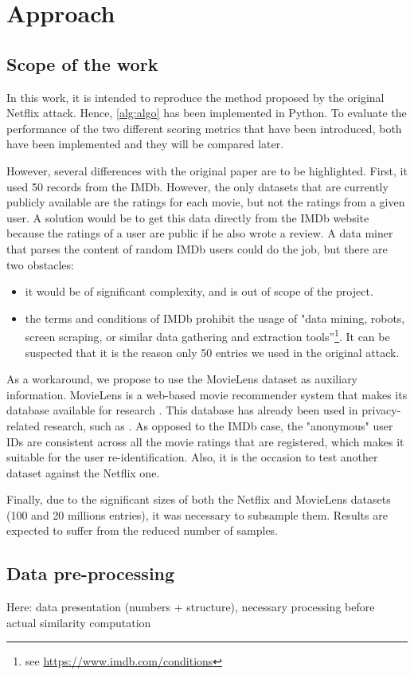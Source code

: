 \section{Approach}\label{sec:approach}

\subsection{Scope of the work}

In this work, it is intended to reproduce the method proposed by the original Netflix attack. Hence, \autoref{alg:algo} has been implemented in Python. To evaluate the performance of the two different scoring metrics that have been introduced, both have been implemented and they will be compared later.

However, several differences with the original paper are to be highlighted. First, it used 50 records from the IMDb. However, the only datasets that are currently publicly available are the ratings for each movie, but not the ratings from a given user. A solution would be to get this data directly from the IMDb website because the ratings of a user are public if he also wrote a review. A data miner that parses the content of random IMDb users could do the job, but there are two obstacles:

\begin{itemize}
	\item it would be of significant complexity, and is out of scope of the project.
	\item the terms and conditions of IMDb prohibit the usage of "data mining, robots, screen scraping, or similar data gathering and extraction tools”\footnote{see \url{https://www.imdb.com/conditions}}. It can be suspected that it is the reason only 50 entries we used in the original attack. 
\end{itemize}

As a workaround, we propose to use the MovieLens dataset as auxiliary information. MovieLens is a web-based movie recommender system that makes its database available for research \cite{movielens-db}. This database has already been used in privacy-related research, such as \cite{movielens}. As opposed to the IMDb case, the "anonymous" user IDs are consistent across all the movie ratings that are registered, which makes it suitable for the user re-identification. Also, it is the occasion to test another dataset against the Netflix one.

Finally, due to the significant sizes of both the Netflix and MovieLens datasets (100 and 20 millions entries), it was necessary to subsample them. Results are expected to suffer from the reduced number of samples.

\subsection{Data pre-processing}

Here: data presentation (numbers + structure), necessary processing before actual similarity computation